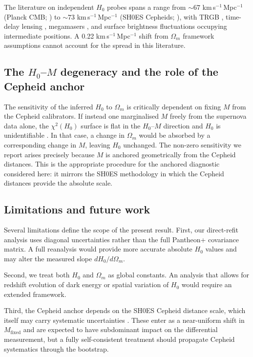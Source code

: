 \documentclass[fleqn,usenatbib,useAMS]{mnras}
\begin{document}
The literature on independent $H_0$ probes spans a range from
${\sim}67$ km\,s$^{-1}$\,Mpc$^{-1}$ (Planck CMB;
\citealt{planck2020}) to ${\sim}73$ km\,s$^{-1}$\,Mpc$^{-1}$
(SH0ES Cepheids; \citealt{riess2022}),
with TRGB \citep{freedman2021,freedman2024},
time-delay lensing \citep{wong2020,birrer2020},
megamasers \citep{pesce2020},
and surface brightness fluctuations \citep{blakeslee2021}
occupying intermediate positions.
A 0.22 km\,s$^{-1}$\,Mpc$^{-1}$ shift from $\Omega_m$
framework assumptions cannot account for the spread in this
literature.

\subsection{The $H_0$--$M$ degeneracy and the role of the Cepheid anchor}

The sensitivity of the inferred $H_0$ to $\Omega_m$ is critically
dependent on fixing $M$ from the Cepheid calibrators.
If instead one marginalised $M$ freely from the supernova data
alone, the $\chi^2(H_0)$ surface is flat in the $H_0$--$M$
direction and $H_0$ is unidentifiable
\citep{efstathiou2020,camarena2021,cardona2017}.
In that case, a change in $\Omega_m$ would be absorbed by
a corresponding change in $M$, leaving $H_0$ unchanged.
The non-zero sensitivity we report arises precisely because
$M$ is anchored geometrically from the Cepheid distances.
This is the appropriate procedure for the anchored diagnostic
considered here: it mirrors the SH0ES methodology in which
the Cepheid distances provide the absolute scale.

\subsection{Limitations and future work}

Several limitations define the scope of the present result.
First, our direct-refit analysis uses diagonal uncertainties
rather than the full Pantheon+ covariance matrix.
A full reanalysis would provide more accurate absolute $H_0$ values
and may alter the measured slope $dH_0/d\Omega_m$.

Second, we treat both $H_0$ and $\Omega_m$ as global constants.
An analysis that allows for redshift evolution of dark energy
or spatial variation of $H_0$ would require an extended framework.

Third, the Cepheid anchor depends on the SH0ES Cepheid distance
scale, which itself may carry systematic uncertainties
\citep{riess2023,breuval2024}.
These enter as a near-uniform shift in $M_\mathrm{fixed}$ and are
expected to have subdominant impact on the differential measurement,
but a fully self-consistent treatment should propagate Cepheid
systematics through the bootstrap.
\end{document}

